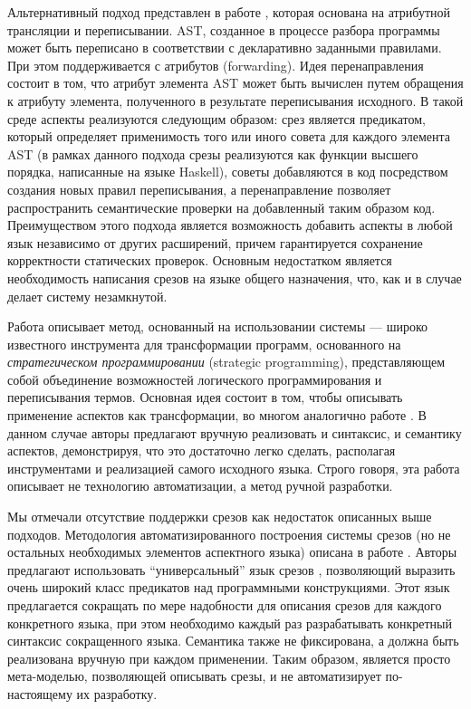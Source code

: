 Альтернативный подход представлен в работе \cite{VanWyk03}, которая основана на атрибутной трансляции и переписывании. AST, созданное в процессе разбора программы может быть переписано в соответствии с декларативно заданными правилами. При этом поддерживается с  атрибутов (forwarding). Идея перенаправления состоит в том, что атрибут элемента AST может быть вычислен путем обращения к атрибуту элемента, полученного в результате переписывания исходного. В такой среде аспекты реализуются следующим образом: срез является предикатом, который определяет применимость того или иного совета для каждого элемента AST (в рамках данного подхода срезы реализуются как функции высшего порядка, написанные на языке Haskell), советы добавляются в код посредством создания новых правил переписывания, а перенаправление позволяет распространить семантические проверки на добавленный таким образом код. Преимуществом этого подхода является возможность добавить аспекты в любой язык независимо от других расширений, причем гарантируется сохранение корректности статических проверок. Основным недостатком является необходимость написания срезов на языке общего назначения, что, как и в случае  делает систему незамкнутой.

Работа \cite{Bagge06} описывает метод, основанный на использовании системы  \cite{Stratego/XT} --- широко известного инструмента для трансформации программ, основанного на \emph{стратегическом программировании} (strategic programming), представляющем собой объединение возможностей логического программирования и переписывания термов. Основная идея состоит в том, чтобы описывать применение аспектов как трансформации, во многом аналогично работе \cite{VanWyk03}. В данном случае авторы предлагают вручную реализовать и синтаксис, и семантику аспектов, демонстрируя, что это достаточно легко сделать, располагая инструментами  и реализацией самого исходного языка. Строго говоря, эта работа описывает не технологию автоматизации, а метод ручной разработки.

Мы отмечали отсутствие поддержки срезов как недостаток описанных выше подходов. Методология автоматизированного построения системы срезов (но не остальных необходимых элементов аспектного языка) описана в работе \cite{XCPL}. Авторы предлагают использовать ``универсальный'' язык срезов , позволяющий выразить очень широкий класс предикатов над программными конструкциями. Этот язык предлагается сокращать по мере надобности для описания срезов для каждого конкретного языка, при этом необходимо каждый раз разрабатывать конкретный синтаксис сокращенного языка. Семантика  также не фиксирована, а должна быть реализована вручную при каждом применении. Таким образом,  является просто мета-моделью, позволяющей описывать срезы, и не автоматизирует по-настоящему их разработку.

